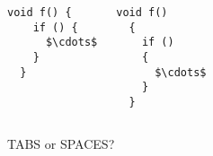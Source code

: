 \begin{frame}{}
  \centerline{}
\end{frame}

\begin{frame}[fragile]{}

  \begin{columns}
      \begin{lstlisting}[style = Cstyle]
  void f() {
    if () {
      $\cdots$
    }
  }
      \end{lstlisting}
      \begin{lstlisting}[style = Cstyle]
  void f()
  {
    if () 
    {
      $\cdots$
    }
  }
      \end{lstlisting}
  \end{columns}
\end{frame}

\begin{frame}{}
  \centerline{\Large TABS or SPACES?}
\end{frame}

\begin{frame}{}
\end{frame}

\begin{frame}{}
  \centerline{\Large {}}
  \vspace{0.20cm}
  \centerline{\large {}}
\end{frame}
